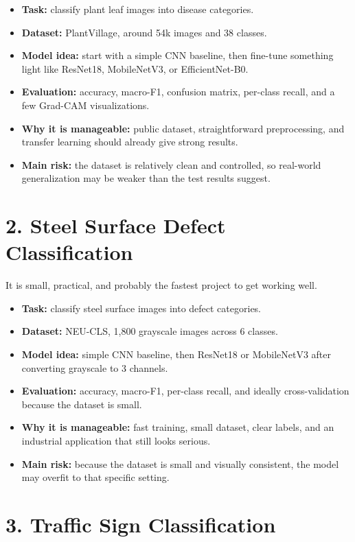 \documentclass[11pt,a4paper]{article}
\begin{document}
\begin{itemize}
\item \textbf{Task:} classify plant leaf images into disease categories.
\item \textbf{Dataset:} PlantVillage, around 54k images and 38 classes.
\item \textbf{Model idea:} start with a simple CNN baseline, then fine-tune something light like ResNet18, MobileNetV3, or EfficientNet-B0.
\item \textbf{Evaluation:} accuracy, macro-F1, confusion matrix, per-class recall, and a few Grad-CAM visualizations.
\item \textbf{Why it is manageable:} public dataset, straightforward preprocessing, and transfer learning should already give strong results.
\item \textbf{Main risk:} the dataset is relatively clean and controlled, so real-world generalization may be weaker than the test results suggest.
\end{itemize}

\section{2. Steel Surface Defect Classification}

It is small, practical, and probably the fastest project to get working well.

\begin{itemize}
\item \textbf{Task:} classify steel surface images into defect categories.
\item \textbf{Dataset:} NEU-CLS, 1,800 grayscale images across 6 classes.
\item \textbf{Model idea:} simple CNN baseline, then ResNet18 or MobileNetV3 after converting grayscale to 3 channels.
\item \textbf{Evaluation:} accuracy, macro-F1, per-class recall, and ideally cross-validation because the dataset is small.
\item \textbf{Why it is manageable:} fast training, small dataset, clear labels, and an industrial application that still looks serious.
\item \textbf{Main risk:} because the dataset is small and visually consistent, the model may overfit to that specific setting.
\end{itemize}

\section{3. Traffic Sign Classification}
\end{document}
